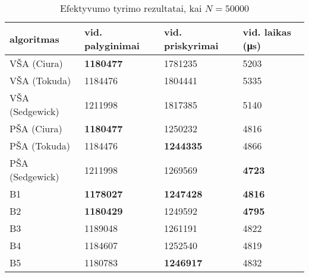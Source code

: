 \documentclass{VUMIFInfKursinis}
\begin{document}
\begin{table}[H]
  \caption{Efektyvumo tyrimo rezultatai, kai $N = 50000$}
  \label{results_50000}
  \centering
  \begin{tabular}{llll}
    algoritmas & vid. palyginimai                         & vid. priskyrimai                         & vid. laikas (μs)                      \\ \midrule
    VŠA (Ciura)       & \cellcolor[HTML]{70AD47}\textbf{1180477} & 1781235                                  & 5203                                  \\
    VŠA (Tokuda)      & 1184476                                  & 1804441                                  & 5335                                  \\
    VŠA (Sedgewick)       & 1211998                                  & 1817385                                  & 5140                                  \\
    PŠA (Ciura)      & \cellcolor[HTML]{70AD47}\textbf{1180477} & 1250232                                  & 4816                                  \\
    PŠA (Tokuda)      & 1184476                                  & \cellcolor[HTML]{70AD47}\textbf{1244335} & 4866                                  \\
    PŠA (Sedgewick)      & 1211998                                  & 1269569                                  & \cellcolor[HTML]{70AD47}\textbf{4723} \\
    B1 & \cellcolor[HTML]{70AD47}\textbf{1178027} & \cellcolor[HTML]{70AD47}\textbf{1247428} & \cellcolor[HTML]{70AD47}\textbf{4816} \\
    B2 & \cellcolor[HTML]{70AD47}\textbf{1180429} & 1249592                                  & \cellcolor[HTML]{70AD47}\textbf{4795} \\
    B3      & 1189048                                  & 1261191                                  & 4822                                  \\
    B4      & 1184607                                  & 1252540                                  & 4819                                  \\ \bottomrule
    B5      & 1180783                                  & \cellcolor[HTML]{70AD47}\textbf{1246917} & 4832                                 \\ \bottomrule          
  \end{tabular}
\end{table}
\end{document}
